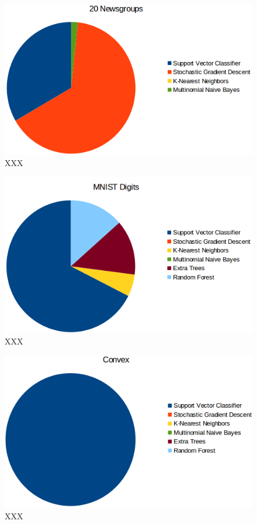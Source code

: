 \documentclass[wcp]{jmlr}
\begin{document}
\begin{figure}
    \centering
    \includegraphics[width=\textwidth]{graphics/newsgroups_pie}
    \caption{
	    XXX
    }
    \label{fig:npie}
\end{figure}
\begin{figure}
    \centering
    \includegraphics[width=\textwidth]{graphics/mnist_pie}
    \caption{
	    XXX
    }
    \label{fig:mpie}
\end{figure}
\begin{figure}
    \centering
    \includegraphics[width=\textwidth]{graphics/convex_pie}
    \caption{
	    XXX
    }
    \label{fig:cpie}
\end{figure}
\end{document}
